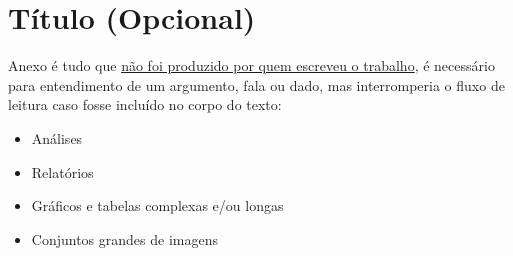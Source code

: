 \chapter{Título (Opcional)}
Anexo é tudo que \underline{não foi produzido por quem escreveu o trabalho}, é necessário para entendimento de um argumento, fala ou dado, mas interromperia o fluxo de leitura caso fosse incluído no corpo do texto: 

\begin{itemize}
    \item Análises 
    \item Relatórios 
    \item Gráficos e tabelas complexas e/ou longas 
    \item Conjuntos grandes de imagens 
\end{itemize}
